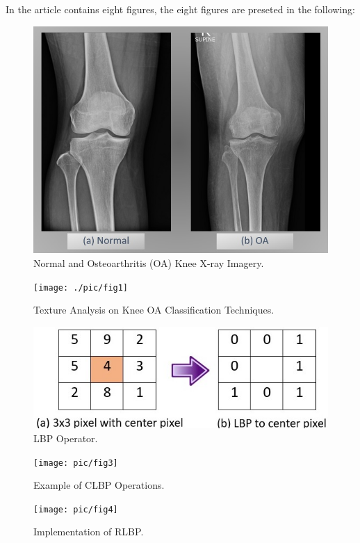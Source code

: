 \documentclass[review]{elsarticle}
\begin{document}
In the article contains eight figures, the eight figures are preseted in the following: 
\vspace{1 cm}
\begin{figure}[h]
	\centering
	\includegraphics[width=0.7\linewidth]{pic/picOA}
	\caption{Normal and Osteoarthritis (OA) Knee X-ray Imagery.}
	\label{fig:picoa}
\end{figure}
\vspace{1 cm}
\begin{figure}[h!]
	\centering
	\texttt{[image: ./pic/fig1]}
	\caption{Texture Analysis on Knee OA Classification Techniques.}
	\label{fig:framework}
\end{figure}
\vspace{1 cm}
\begin{figure}[h]
	\centering
	\includegraphics[width=0.6\linewidth]{pic/fig2}
	\caption{LBP Operator.}
	\label{fig:LBP}
\end{figure}
\vspace{1 cm}
\begin{figure}[h!]
	\centering
	\texttt{[image: pic/fig3]}
	\caption{Example of CLBP Operations.}
	\label{fig:CLBP}
\end{figure}
\vspace{1 cm}
\begin{figure}[h!]
	\centering
	\texttt{[image: pic/fig4]}
	\caption{Implementation of RLBP.}
	\label{fig:RLBP}
\end{figure}
\vspace{1 cm}
\end{document}
